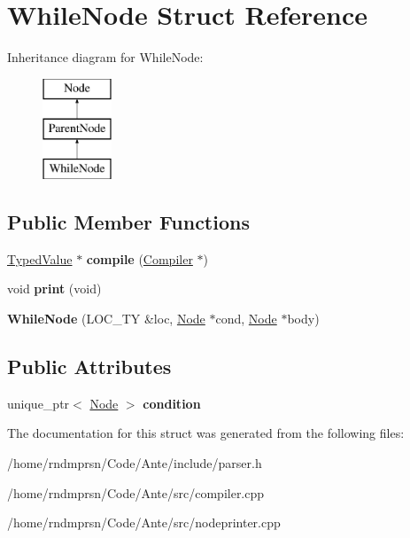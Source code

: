 \hypertarget{structWhileNode}{}\section{While\+Node Struct Reference}
\label{structWhileNode}
Inheritance diagram for While\+Node\+:\begin{figure}[H]
\begin{center}
\leavevmode
\includegraphics[height=3.000000cm]{structWhileNode}
\end{center}
\end{figure}
\subsection*{Public Member Functions}
\begin{DoxyCompactItemize}
\item 
\mbox{\label{structWhileNode_a1418e6ac15733b1f9ce5b5e54a4fbb64}} 
\hyperlink{structTypedValue}{Typed\+Value} $\ast$ {\bfseries compile} (\hyperlink{structante_1_1Compiler}{Compiler} $\ast$)
\item 
\mbox{\label{structWhileNode_ad06cd2cbb666af783871857531136d32}} 
void {\bfseries print} (void)
\item 
\mbox{\label{structWhileNode_a2cefe32dec752a3e7ba81725d6c2cf31}} 
{\bfseries While\+Node} (L\+O\+C\+\_\+\+TY \&loc, \hyperlink{structNode}{Node} $\ast$cond, \hyperlink{structNode}{Node} $\ast$body)
\end{DoxyCompactItemize}
\subsection*{Public Attributes}
\begin{DoxyCompactItemize}
\item 
\mbox{\label{structWhileNode_a92f37d51e51a6ad1ce5ea0c9659167c8}} 
unique\+\_\+ptr$<$ \hyperlink{structNode}{Node} $>$ {\bfseries condition}
\end{DoxyCompactItemize}


The documentation for this struct was generated from the following files\+:\begin{DoxyCompactItemize}
\item 
/home/rndmprsn/\+Code/\+Ante/include/parser.\+h\item 
/home/rndmprsn/\+Code/\+Ante/src/compiler.\+cpp\item 
/home/rndmprsn/\+Code/\+Ante/src/nodeprinter.\+cpp\end{DoxyCompactItemize}
